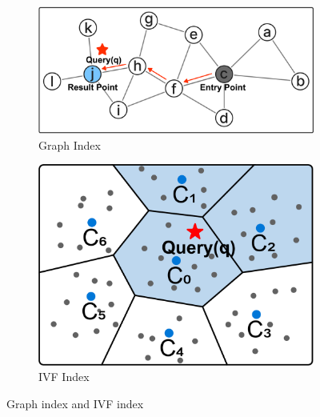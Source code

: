 \documentclass[sigconf, nonacm]{acmart}
\begin{document}
\begin{sloppypar}
\begin{figure}
    \begin{subfigure}{0.60\columnwidth}
        \centering
        \setlength{\abovecaptionskip}{0cm}
        \setlength{\belowcaptionskip}{-0.3cm}
        \includegraphics[width=\linewidth]{figures/graph.pdf}
        \caption{Graph Index}
        \label{fig:graph}
    \end{subfigure}
    \hfill
    \begin{subfigure}{0.38\columnwidth}
        \centering
        \setlength{\abovecaptionskip}{0cm}
        \setlength{\belowcaptionskip}{-0.3cm}
        \includegraphics[width=\linewidth]{figures/ivf.pdf}
        \caption{IVF Index}
        \label{fig:ivf}
    \end{subfigure}
    \setlength{\abovecaptionskip}{0cm}
    \setlength{\belowcaptionskip}{0.2cm}
    \caption{Graph index and IVF index}
\end{figure}



\end{sloppypar}
\end{document}
